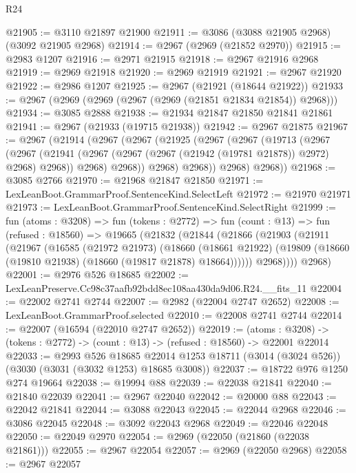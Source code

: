 \begin{lexlean}{R24}
\begin{coremodule}
@21905 := @3110 @21897 @21900
@21911 := @3086 (@3088 @21905 @2968) (@3092 @21905 @2968)
@21914 := @2967 (@2969 (@21852 @2970))
@21915 := @2983 @1207
@21916 := @2971 @21915
@21918 := @2967 @21916 @2968
@21919 := @2969 @21918
@21920 := @2969 @21919
@21921 := @2967 @21920
@21922 := @2986 @1207
@21925 := @2967 (@21921 (@18644 @21922))
@21933 := @2967 (@2969 (@2969 (@2967 (@2969 (@21851 @21834 @21854)) @2968)))
@21934 := @3085 @2888
@21938 := @21934 @21847 @21850 @21841 @21861
@21941 := @2967 (@21933 (@19715 @21938))
@21942 := @2967 @21875
@21967 := @2967
    (@21914
      (@2967
        (@2967
          (@21925
            (@2967
              (@2967
                (@19713
                  (@2967
                    (@2967
                      (@21941 (@2967 (@2967 (@2967 (@21942 (@19781 @21878)) @2972) @2968) @2968))
                      @2968)
                    @2968))
                @2968)
              @2968))
          @2968)
        @2968))
@21968 := @3085 @2766
@21970 := @21968 @21847 @21850
@21971 := LexLeanBoot.GrammarProof.SentenceKind.SelectLeft
@21972 := @21970 @21971
@21973 := LexLeanBoot.GrammarProof.SentenceKind.SelectRight
@21999 := fun (atoms : @3208) =>
  fun (tokens : @2772) =>
  fun (count : @13) =>
  fun (refused : @18560) =>
  @19665
    (@21832
      (@21844
        (@21866
          (@21903
            (@21911
              (@21967
                (@16585
                  (@21972 @21973)
                  (@18660
                    (@18661 @21922)
                    (@19809 (@18660 (@19810 @21938) (@18660 (@19817 @21878) @18664))))))
              @2968))))
      @2968)
@22001 := @2976 @526 @18685
@22002 := LexLeanPreserve.Cc98c37aafb92bdd8ec108aa430da9d06.R24.__fits_11
@22004 := @22002 @2741 @2744
@22007 := @2982 (@22004 @2747 @2652)
@22008 := LexLeanBoot.GrammarProof.selected
@22010 := @22008 @2741 @2744
@22014 := @22007 (@16594 (@22010 @2747 @2652))
@22019 := (atoms : @3208) ->
  (tokens : @2772) -> (count : @13) -> (refused : @18560) -> @22001 @22014
@22033 := @2993
    @526
    @18685
    @22014
    @1253
    @18711
    (@3014 (@3024 @526))
    (@3030 (@3031 (@3032 @1253) @18685 @3008))
@22037 := @18722 @976 @1250 @274 @19664
@22038 := @19994 @88
@22039 := @22038 @21841
@22040 := @21840 @22039
@22041 := @2967 @22040
@22042 := @20000 @88
@22043 := @22042 @21841
@22044 := @3088 @22043
@22045 := @22044 @2968
@22046 := @3086 @22045
@22048 := @3092 @22043 @2968
@22049 := @22046 @22048
@22050 := @22049 @2970
@22054 := @2969 (@22050 (@21860 (@22038 @21861)))
@22055 := @2967 @22054
@22057 := @2969 (@22050 @2968)
@22058 := @2967 @22057

\end{coremodule}
\end{lexlean}
